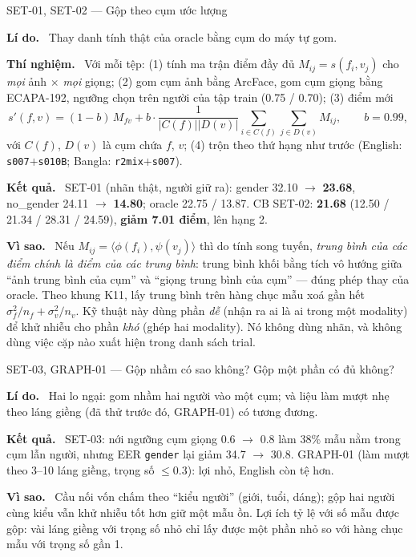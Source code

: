 \documentclass[11pt,a4paper,oneside]{report}
\newcommand{\up}[1]{\textbf{\color{good}#1}}
\newcommand{\id}[1]{\texttt{#1}}
\newcommand{\field}[1]{\par\smallskip\textbf{\color{accent}#1.}~}
\begin{document}
\begin{expbox}{SET-01, SET-02 --- Gộp theo cụm ước lượng}
\field{Lí do} Thay danh tính thật của oracle bằng cụm do máy tự gom.
\field{Thí nghiệm} Với mỗi tệp: (1) tính ma trận điểm đầy đủ $M_{ij}=s(f_i,v_j)$ cho \emph{mọi} ảnh $\times$ \emph{mọi} giọng; (2) gom cụm ảnh bằng ArcFace, gom cụm giọng bằng ECAPA-192, ngưỡng chọn trên người của tập train (0.75 / 0.70); (3) điểm mới
\[
s'(f,v)=(1-b)\,M_{fv}+b\cdot\frac{1}{|C(f)||D(v)|}\sum_{i\in C(f)}\sum_{j\in D(v)}M_{ij},\qquad b=0.99,
\]
với $C(f)$, $D(v)$ là cụm chứa $f$, $v$; (4) trộn theo thứ hạng như trước (English: \id{s007}$+$\id{s010B}; Bangla: \id{r2mix}$+$\id{s007}).
\field{Kết quả} SET-01 (nhãn thật, người giữ ra): gender 32.10 $\to$ \up{23.68}, no\_gender 24.11 $\to$ \up{14.80}; oracle 22.75 / 13.87. CB SET-02: \up{21.68} (12.50 / 21.34 / 28.31 / 24.59), \textbf{giảm 7.01 điểm}, lên hạng 2.
\field{Vì sao} Nếu $M_{ij}=\langle\phi(f_i),\psi(v_j)\rangle$ thì do tính song tuyến, \emph{trung bình của các điểm chính là điểm của các trung bình}: trung bình khối bằng tích vô hướng giữa ``ảnh trung bình của cụm'' và ``giọng trung bình của cụm'' --- đúng phép thay của oracle. Theo khung K11, lấy trung bình trên hàng chục mẫu xoá gần hết $\sigma_f^2/n_f+\sigma_v^2/n_v$. Kỹ thuật này dùng phần \emph{dễ} (nhận ra ai là ai trong một modality) để khử nhiễu cho phần \emph{khó} (ghép hai modality). Nó không dùng nhãn, và không dùng việc cặp nào xuất hiện trong danh sách trial.
\end{expbox}

\begin{expbox}{SET-03, GRAPH-01 --- Gộp nhầm có sao không? Gộp một phần có đủ không?}
\field{Lí do} Hai lo ngại: gom nhầm hai người vào một cụm; và liệu làm mượt nhẹ theo láng giềng (đã thử trước đó, GRAPH-01) có tương đương.
\field{Kết quả} SET-03: nới ngưỡng cụm giọng 0.6 $\to$ 0.8 làm 38\% mẫu nằm trong cụm lẫn người, nhưng EER \id{gender} lại giảm 34.7 $\to$ 30.8. GRAPH-01 (làm mượt theo 3--10 láng giềng, trọng số $\le0.3$): lợi nhỏ, English còn tệ hơn.
\field{Vì sao} Cầu nối vốn chấm theo ``kiểu người'' (giới, tuổi, dáng); gộp hai người cùng kiểu vẫn khử nhiễu tốt hơn giữ một mẫu ồn. Lợi ích tỷ lệ với số mẫu được gộp: vài láng giềng với trọng số nhỏ chỉ lấy được một phần nhỏ so với hàng chục mẫu với trọng số gần 1.
\end{expbox}
\end{document}
